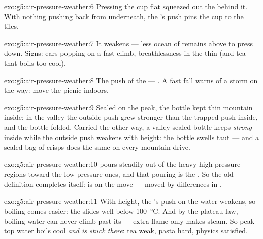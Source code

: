 \begin{solution}{exo:g5:air-pressure-weather:6}
Pressing the cup flat squeezed out the  behind it. With nothing
pushing back from underneath, the 's push pins the cup to
the tiles.
\end{solution}

\begin{solution}{exo:g5:air-pressure-weather:7}
It weakens --- less ocean of  remains above to press down.
Signs: ears popping on a fast climb, breathlessness in the thin
 (and tea that boils too cool).
\end{solution}

\begin{solution}{exo:g5:air-pressure-weather:8}
The push of the  --- . A fast fall warns of a
storm on the way: move the picnic indoors.
\end{solution}

\begin{solution}{exo:g5:air-pressure-weather:9}
Sealed on the peak, the bottle kept thin mountain  inside; in
the valley the outside push grew stronger than the trapped push
inside, and the bottle folded. Carried the other way, a
valley-sealed bottle keeps \emph{strong}  inside while the
outside push weakens with height: the bottle swells taut --- and a
sealed bag of crisps does the same on every mountain drive.
\end{solution}

\begin{solution}{exo:g5:air-pressure-weather:10}
 pours steadily out of the heavy high-pressure regions toward
the  low-pressure ones, and that pouring is the . So the
old definition completes itself:  is  on the move --- moved
by differences in .
\end{solution}

\begin{solution}{exo:g5:air-pressure-weather:11}
With height, the 's push on the water weakens, so
boiling comes easier: the  slides well below
\qty{100}{\celsius}. And by the plateau law, boiling water can
never climb past its  --- extra flame only makes
steam. So peak-top water boils cool \emph{and is stuck there}: tea
weak, pasta hard, physics satisfied.
\end{solution}
